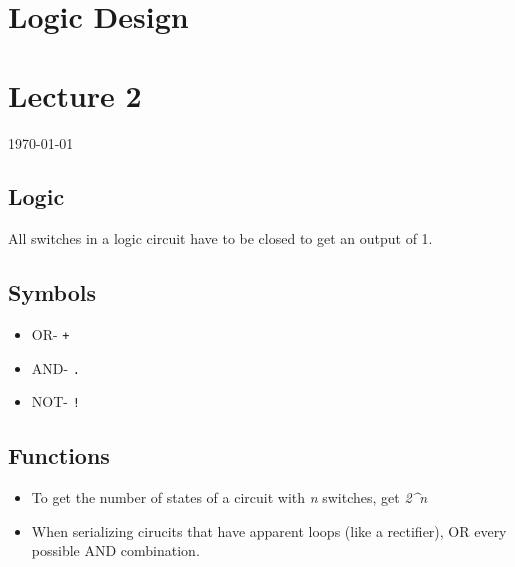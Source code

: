\documentclass[12pt]{article}
\begin{document}
{\centering
\section*{Logic Design}
\section*{Lecture 2}
\indent\today
}

\subsection*{Logic}
All switches in a logic circuit have to be closed to get an output of 1.

\subsection*{Symbols}
\begin{itemize}
    \item OR- \texttt{+}
    \item AND- \texttt{.}
    \item NOT- \texttt{!}
\end{itemize}

\subsection*{Functions}
\begin{itemize}
    \item To get the number of states of a circuit with \textit{n} switches, get \textit{2^n}
    \item When serializing cirucits that have apparent loops (like a rectifier), OR every possible AND combination.
\end{itemize}
\end{document}
